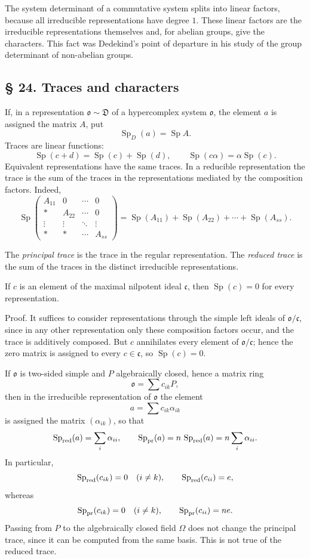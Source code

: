 \documentclass[11pt]{article}
\providecommand{\mo}{\mathfrak{o}}
\providecommand{\mc}{\mathfrak{c}}
\begin{document}
The system determinant of a commutative system splits into linear factors, because all irreducible representations have degree $1$. These linear factors are the irreducible representations themselves and, for abelian groups, give the characters. This fact was Dedekind's point of departure in his study of the group determinant of non-abelian groups.

\subsection*{§ 24. Traces and characters}
If, in a representation $\mo\sim\mathfrak D$ of a hypercomplex system $\mo$, the element $a$ is assigned the matrix $A$, put
\[
        \operatorname{Sp}_D(a)=\operatorname{Sp} A.
\]
Traces are linear functions:
\[
        \operatorname{Sp}(c+d)=\operatorname{Sp}(c)+\operatorname{Sp}(d),
        \qquad
        \operatorname{Sp}(c\alpha)=\alpha\operatorname{Sp}(c).
\]
Equivalent representations have the same traces. In a reducible representation the trace is the sum of the traces in the representations mediated by the composition factors. Indeed,
\[
        \operatorname{Sp}\begin{pmatrix}
        A_{11}&0&\cdots&0\\
        *&A_{22}&\cdots&0\\
        \vdots&\vdots&\ddots&\vdots\\
        *&*&\cdots&A_{ss}
        \end{pmatrix}
        =\operatorname{Sp}(A_{11})+\operatorname{Sp}(A_{22})+\cdots+\operatorname{Sp}(A_{ss}).
\]

The \emph{principal trace} is the trace in the regular representation. The \emph{reduced trace} is the sum of the traces in the distinct irreducible representations.

If $c$ is an element of the maximal nilpotent ideal $\mc$, then $\operatorname{Sp}(c)=0$ for every representation.

Proof. It suffices to consider representations through the simple left ideals of $\mo/\mc$, since in any other representation only these composition factors occur, and the trace is additively composed. But $c$ annihilates every element of $\mo/\mc$; hence the zero matrix is assigned to every $c\in\mc$, so $\operatorname{Sp}(c)=0$.

If $\mo$ is two-sided simple and $P$ algebraically closed, hence a matrix ring
\[
        \mo=\sum c_{ik}P,
\]
then in the irreducible representation of $\mo$ the element
\[
        a=\sum c_{ik}\alpha_{ik}
\]
is assigned the matrix $(\alpha_{ik})$, so that
\[
        \operatorname{Sp}_{\rm red}(a)=\sum_i\alpha_{ii},
        \qquad
        \operatorname{Sp}_{\rm pr}(a)=n\,\operatorname{Sp}_{\rm red}(a)=n\sum_i\alpha_{ii}.
\]
In particular,
\[
        \operatorname{Sp}_{\rm red}(c_{ik})=0\quad(i\ne k),\qquad
        \operatorname{Sp}_{\rm red}(c_{ii})=e,
\]
whereas
\[
        \operatorname{Sp}_{\rm pr}(c_{ik})=0\quad(i\ne k),\qquad
        \operatorname{Sp}_{\rm pr}(c_{ii})=n e.
\]
Passing from $P$ to the algebraically closed field $\Omega$ does not change the principal trace, since it can be computed from the same basis. This is not true of the reduced trace.
\end{document}
